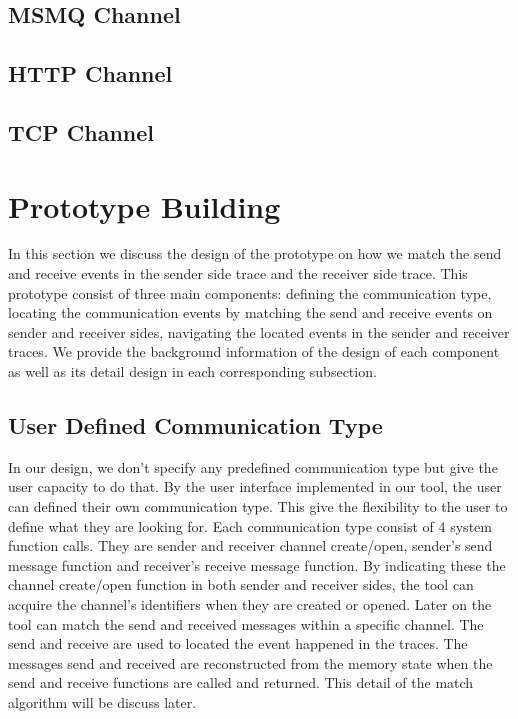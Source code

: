 \documentclass[paper=a4, fontsize=11pt]{scrartcl}
\numberwithin{equation}{section}		%
\numberwithin{figure}{section}			%
\numberwithin{table}{section}				%
\begin{document}
\subsection{MSMQ Channel}
\subsection{HTTP Channel}
\subsection{TCP Channel}


\section{Prototype Building}
In this section we discuss the design of the prototype on how we match the send and receive events in the sender side trace and the receiver side trace. This prototype consist of three main components: defining the communication type, locating the communication events by matching the send and receive events on sender and receiver sides, navigating the located events in the sender and receiver traces. We provide the background information of the design of each component as well as its detail design in each corresponding subsection.
\subsection{User Defined Communication Type}
In our design, we don't specify any predefined communication type but give the user capacity to do that. By the user interface implemented in our tool, the user can defined their own communication type. This give the flexibility to the user to define what they are looking for. Each communication type consist of 4 system function calls. They are sender and receiver channel create/open, sender's send message function and receiver's receive message function. By indicating these the channel create/open function in both sender and receiver sides, the tool can acquire the channel's identifiers when they are created or opened. Later on the tool can match the send and received messages within a specific channel. The send and receive are used to located the event happened in the traces. The messages send and received are reconstructed from the memory state when the send and receive functions are called and returned. This detail of the match algorithm will be discuss later.
\end{document}
